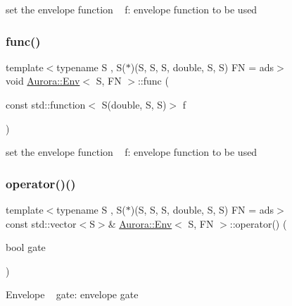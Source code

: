 set the envelope function ~\newline
f\+: envelope function to be used \mbox{\label{class_aurora_1_1_env_a92aec91bb78127cf50d5d841870cce14}} 
\subsubsection{\texorpdfstring{func()}{func()}\hspace{0.1cm}{\footnotesize\ttfamily [2/2]}}
{\footnotesize\ttfamily template$<$typename S , S($\ast$)(\+S, S, S, double, S, S) FN = ads$>$ \\
void \hyperlink{class_aurora_1_1_env}{Aurora\+::\+Env}$<$ S, FN $>$\+::func (\begin{DoxyParamCaption}\item[{const std\+::function$<$ S(double, S, S)$>$}]{f }\end{DoxyParamCaption})\hspace{0.3cm}{\ttfamily [inline]}}

set the envelope function ~\newline
f\+: envelope function to be used \mbox{\label{class_aurora_1_1_env_ae4e2dec694f0be0f0efa5b073a06fef5}} 
\subsubsection{\texorpdfstring{operator()()}{operator()()}\hspace{0.1cm}{\footnotesize\ttfamily [1/6]}}
{\footnotesize\ttfamily template$<$typename S , S($\ast$)(\+S, S, S, double, S, S) FN = ads$>$ \\
const std\+::vector$<$S$>$\& \hyperlink{class_aurora_1_1_env}{Aurora\+::\+Env}$<$ S, FN $>$\+::operator() (\begin{DoxyParamCaption}\item[{bool}]{gate }\end{DoxyParamCaption})\hspace{0.3cm}{\ttfamily [inline]}}

Envelope ~\newline
gate\+: envelope gate \mbox{\label{class_aurora_1_1_env_a664e3c6ce7e66de66305ab220c116792}} 
